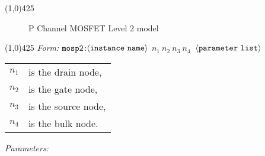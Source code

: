 \documentclass{article}
\begin{document}
\hrulefill\linethickness{0.5mm}\line(1,0){425} \normalsize
\newline
\begin{figure}[h]
\centerline{\epsfxsize=4in} \caption{P Channel MOSFET
Level 2 model}
\end{figure}
\newline
\linethickness{0.5mm} \line(1,0){425}
\newline
\textit{Form:}
\newline
$\tt mosp2$:$\langle \tt{instance\ name}\rangle$ $n_1\ n_2\ n_3\
n_4\ $ $\langle \tt{parameter\ list}\rangle$
\newline
\begin{tabular}{r l}
$n_1$ & is the drain node, \\
$n_2$ & is the gate node, \\
$n_3$ & is the source node, \\
$n_4$ & is the bulk node. \\
\end{tabular}
\newline
\textit{Parameters:}
\end{document}
